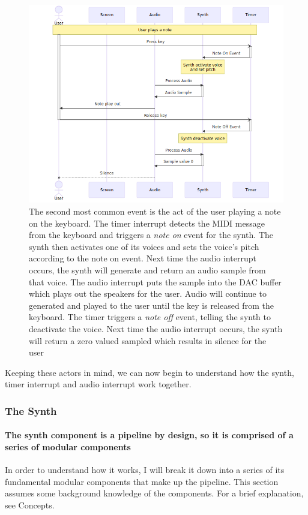 \documentclass[acmlarge,screen]{acmart}
\begin{document}
	\begin{figure}[H]
		\centering
		\caption{The second most common event is the act of the user playing a note on the keyboard. The timer interrupt detects the MIDI message from the keyboard and triggers a \textit{note on} event for the synth. The synth then activates one of its voices and sets the voice's pitch according to the note on event. Next time the audio interrupt occurs, the synth will generate and return an audio sample from that voice. The audio interrupt puts the sample into the DAC buffer which plays out the speakers for the user. Audio will continue to generated and played to the user until the key is released from the keyboard. The timer triggers a \textit{note off} event, telling the synth to deactivate the voice. Next time the audio interrupt occurs, the synth will return a zero valued sampled which results in silence for the user}
		\includegraphics[width=.9\linewidth]{play_note_sequence}
	\end{figure}
	
	Keeping these actors in mind, we can now begin to understand how the synth, timer interrupt and audio interrupt work together.
	
	\subsubsection{The Synth}
	\paragraph{The synth component is a pipeline by design, so it is comprised of a series of modular components} In order to understand how it works, I will break it down into a series of its fundamental modular components that make up the pipeline. This section assumes some background knowledge of the components. For a brief explanation, see Concepts.
	
\end{document}
